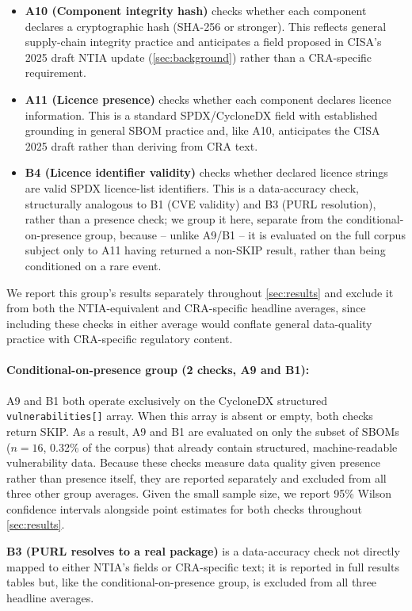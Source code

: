 \documentclass[11pt]{article}
\begin{document}
\begin{itemize}
\item \textbf{A10 (Component integrity hash)} checks whether each component declares a cryptographic hash (SHA-256 or stronger). This reflects general supply-chain integrity practice and anticipates a field proposed in CISA's 2025 draft NTIA update \cite{cisa2025} (\cref{sec:background}) rather than a CRA-specific requirement.
\item \textbf{A11 (Licence presence)} checks whether each component declares licence information. This is a standard SPDX/CycloneDX field with established grounding in general SBOM practice and, like A10, anticipates the CISA 2025 draft rather than deriving from CRA text.
\item \textbf{B4 (Licence identifier validity)} checks whether declared licence strings are valid SPDX licence-list identifiers. This is a data-accuracy check, structurally analogous to B1 (CVE validity) and B3 (PURL resolution), rather than a presence check; we group it here, separate from the conditional-on-presence group, because -- unlike A9/B1 -- it is evaluated on the full corpus subject only to A11 having returned a non-SKIP result, rather than being conditioned on a rare event.
\end{itemize}

We report this group's results separately throughout \cref{sec:results} and exclude it from both the NTIA-equivalent and CRA-specific headline averages, since including these checks in either average would conflate general data-quality practice with CRA-specific regulatory content.

\paragraph{Conditional-on-presence group (2 checks, A9 and B1):} A9 and B1 both operate exclusively on the CycloneDX structured \texttt{vulnerabilities[]} array. When this array is absent or empty, both checks return SKIP. As a result, A9 and B1 are evaluated on only the subset of SBOMs ($n=16$, 0.32\% of the corpus) that already contain structured, machine-readable vulnerability data. Because these checks measure data quality given presence rather than presence itself, they are reported separately and excluded from all three other group averages. Given the small sample size, we report 95\% Wilson confidence intervals alongside point estimates for both checks throughout \cref{sec:results}.

\textbf{B3 (PURL resolves to a real package)} is a data-accuracy check not directly mapped to either NTIA's fields or CRA-specific text; it is reported in full results tables but, like the conditional-on-presence group, is excluded from all three headline averages.
\end{document}
